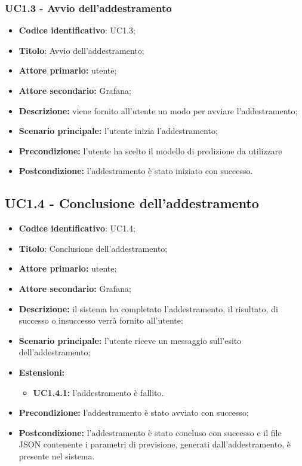 \documentclass{article}
\begin{document}
	\subsubsection{UC1.3 - Avvio dell'addestramento}
	\begin{itemize}
		\item \textbf{Codice identificativo}: UC1.3;
		\item \textbf{Titolo}: Avvio dell'addestramento;
		\item \textbf{Attore primario:} utente;
		\item \textbf{Attore secondario:} Grafana\glo;
		\item \textbf{Descrizione:} viene fornito all'utente un modo per avviare l'addestramento;
		\item \textbf{Scenario principale:} l'utente inizia l'addestramento; 
		\item \textbf{Precondizione:} l'utente ha scelto il modello di predizione da utilizzare
		\item \textbf{Postcondizione:} l'addestramento è stato iniziato con successo.
	\end{itemize}

	\subsection{UC1.4 - Conclusione dell'addestramento}
	\begin{itemize}
		\item \textbf{Codice identificativo}: UC1.4;
		\item \textbf{Titolo}: Conclusione dell'addestramento;
		\item \textbf{Attore primario:} utente;
		\item \textbf{Attore secondario:} Grafana\glo;
		\item \textbf{Descrizione:} il sistema ha completato l'addestramento, il risultato, di successo o insuccesso verrà fornito all'utente;
		\item \textbf{Scenario principale:} l'utente riceve un messaggio sull'esito dell'addestramento;
		\item \textbf{Estensioni:}
			\begin{itemize}
				\item \textbf{UC1.4.1:} l'addestramento è fallito.
			\end{itemize}
		\item \textbf{Precondizione:} l'addestramento è stato avviato con successo;
		\item \textbf{Postcondizione:} l'addestramento è stato concluso con successo e il file JSON contenente i parametri di previsione, generati dall'addestramento, è presente nel sistema.
	\end{itemize}
\end{document}
